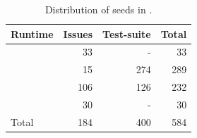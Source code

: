 \begin{table}
\vspace{-10pt}
\centering
\scriptsize
\setlength{\tabcolsep}{2pt}
\caption{Distribution of seeds in \tname{}.}
\label{tab:seed_distribution}
\begin{tabular}{@{}lrrr@{}}
    \toprule
    \textbf{Runtime} & \textbf{Issues} & \textbf{Test-suite} & \textbf{Total} \\
    \midrule
    \wasmtime{} & 33  & -   & 33  \\
    \wasmer{}   & 15  & 274 & 289 \\
    \wamr{}     & 106 & 126 & 232 \\
    \wasmedge{} & 30  & -   & 30  \\
    \midrule
    Total       & 184 & 400 & 584 \\
    \bottomrule
\end{tabular}
\end{table}
